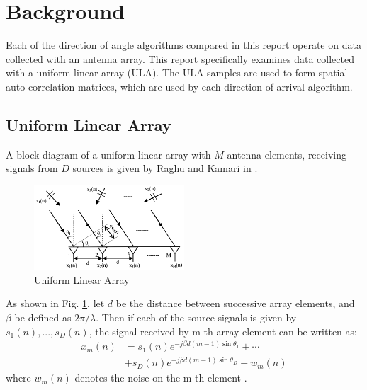 \documentclass[conference]{IEEEtran}
\begin{document}
	\section{Background}
	
	Each of the direction of angle algorithms compared in this report operate on data collected with an antenna array. This report specifically examines data collected with a uniform linear array (ULA). The ULA samples are used to form spatial auto-correlation matrices, which are used by each direction of arrival algorithm.
	
	\subsection{Uniform Linear Array}
	
	A block diagram of a uniform linear array with $M$ antenna elements, receiving signals from $D$ sources is given by Raghu and Kamari in \cite{doa_algorithms_raghu}.
	
	\begin{figure}
		\centerline{\includegraphics[width=0.5\textwidth]{uniform_linear_array.png}}
		\caption{Uniform Linear Array \cite{doa_algorithms_raghu}}
		\label{fig::uniform_linear_array}
	\end{figure}
	
	As shown in Fig. \ref{fig::uniform_linear_array}, let $d$ be the distance between successive array elements, and $\beta$ be defined as $2\pi/\lambda$. Then if each of the source signals is given by $s_1(n),...,s_D(n)$, the signal received by m-th array element can be written as:
	\begin{equation}
		\label{received_signal}
		\begin{split}
			x_m(n) &= s_1(n)e^{-j{\beta}d(m-1)\sin{\theta_1}} + \cdots\\
			&+ s_D(n)e^{-j{\beta}d(m-1)\sin{\theta_D}} + w_m(n)
		\end{split}
	\end{equation}
	where $w_m(n)$ denotes the noise on the m-th element \cite{doa_algorithms_raghu}.
	
\end{document}
